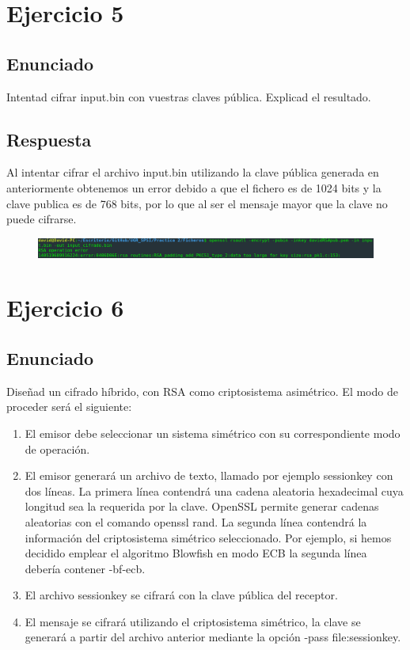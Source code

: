 \documentclass[10pt,a4paper,spanish]{report}
\begin{document}
\chapter{Ejercicio 5}

\section{Enunciado}
\noindent
Intentad cifrar input.bin con vuestras claves pública. Explicad el resultado.

\section{Respuesta}
\noindent
Al intentar cifrar el archivo input.bin utilizando la clave pública generada en anteriormente obtenemos un error debido a que el fichero es de 1024 bits y la clave publica es de 768 bits, por lo que al ser el mensaje mayor que la clave no puede cifrarse.

\begin{figure}[!hbp]
 \centering  \includegraphics[width=1\textwidth]{./Imagenes/5.png}
\end{figure}

\chapter{Ejercicio 6}

\section{Enunciado}
\noindent
Diseñad un cifrado híbrido, con RSA como criptosistema asimétrico. El modo de proceder será el siguiente:
\begin{enumerate}
 \item El emisor debe seleccionar un sistema simétrico con su correspondiente modo de operación.
 \item El emisor generará un archivo de texto, llamado por ejemplo sessionkey con dos líneas. La primera línea contendrá una cadena aleatoria hexadecimal cuya longitud sea la requerida por la clave. OpenSSL permite generar cadenas aleatorias con el comando openssl rand. La segunda línea contendrá la información del criptosistema simétrico seleccionado. Por ejemplo, si hemos decidido emplear el algoritmo Blowfish en modo ECB la segunda línea debería contener -bf-ecb.
 \item El archivo sessionkey se cifrará con la clave pública del receptor.
 \item El mensaje se cifrará utilizando el criptosistema simétrico, la clave se generará a partir del archivo anterior mediante la opción -pass file:sessionkey.
\end{enumerate}
\end{document}
